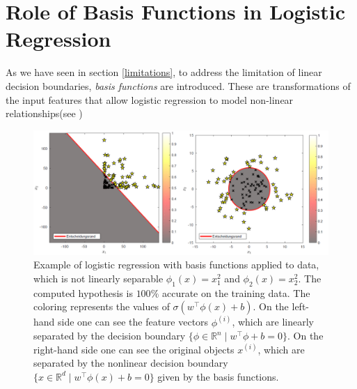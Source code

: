 \section{Role of Basis Functions in Logistic Regression}
As we have seen in section \ref{limitations}, to address the limitation of linear decision boundaries, \emph{basis functions} are introduced. These are transformations of the input features that allow logistic regression to model non-linear relationships(see \cite[chapter 4.3.2]{bishop2006pattern})\\

\begin{figure}[h!]
    \centering
    \includegraphics[width=\textwidth]{images/figure5.png}
    \caption{
        Example of logistic regression with basis functions applied to data, which is not linearly separable $\phi_1(x) = x_1^2$ and $\phi_2(x) = x_2^2$. The computed hypothesis is $100\%$ accurate on the training data. The coloring represents the values of $\sigma(w^\top \phi(x)+b)$. On the left-hand side one can see the feature vectors $\phi^{(i)}$, which are linearly separated by the decision boundary $\{\phi \in \mathbb{R}^n\mid w^ \top\phi+b =0\}$. On the right-hand side one can see the original objects $x^{(i)}$, which are separated by the nonlinear decision boundary $\{x \in \mathbb{R}^d\mid w^ \top\phi(x)+b =0\}$ given by the basis functions.
    }
    \label{fig:5}
\end{figure}

